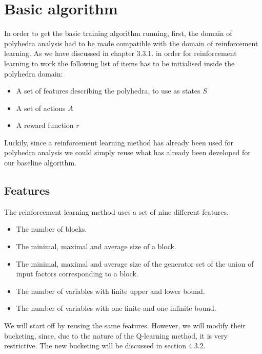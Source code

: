 \section{Basic algorithm}
In order to get the basic training algorithm running, first, the domain of polyhedra analysis had to be made compatible with the domain of reinforcement learning. As we have discussed in chapter 3.3.1. in order for reinforcement learning to work the following list of items has to be initialised inside the polyhedra domain:
\begin{itemize}
    \item A set of features describing the polyhedra, to use as states $S$
    \item A set of actions $A$
    \item A reward function $r$
\end{itemize}
Luckily, since a reinforcement learning method \cite{singh2018fast} has already been used for polyhedra analysis we could simply reuse what has already been developed for our baseline algorithm.\\
\subsection{Features}
The reinforcement learning method uses a set of nine different features.
\begin{itemize}
    \item The number of blocks.
    \item The minimal, maximal and average size of a block.
    \item The minimal, maximal and average size of the generator set of the union of input factors corresponding to a block.
    \item The number of variables with finite upper and lower bound.
    \item The number of variables with one finite and one infinite bound.
\end{itemize}
We will start off by reusing the same features. However, we will modify their bucketing, since, due to the nature of the Q-learning method, it is very restrictive. The new bucketing will be discussed in section 4.3.2.

